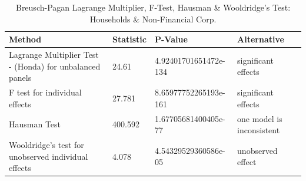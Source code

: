 \begin{table}[ht]
\centering
\caption{Breusch-Pagan Lagrange Multiplier, F-Test, Hausman & Wooldridge's Test: Households & Non-Financial Corp.} 
\begingroup\small
\begin{tabular}{llll}
  \toprule
Method & Statistic & P-Value & Alternative \\ 
  \midrule
Lagrange Multiplier Test -  (Honda) for unbalanced panels & 24.61 & 4.92401701651472e-134 & significant effects \\ 
  F test for individual effects & 27.781 & 8.65977752265193e-161 & significant effects \\ 
  Hausman Test & 400.592 & 1.67705681400405e-77 & one model is inconsistent \\ 
  Wooldridge's test for unobserved individual effects & 4.078 & 4.54329529360586e-05 & unobserved effect \\ 
   \bottomrule
\end{tabular}
\endgroup
\end{table}
